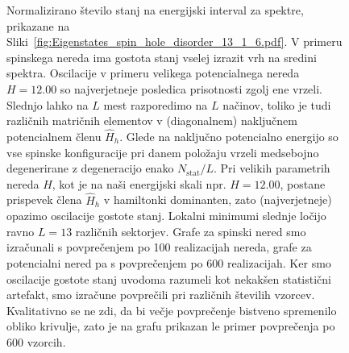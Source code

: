  \begin{figure}[H]
\caption{Normalizirano število stanj na energijski interval za spektre, prikazane na Sliki~\ref{fig:Eigenstates_spin_hole_disorder_13_1_6.pdf}. V primeru spinskega nereda ima gostota stanj vselej izrazit vrh na sredini spektra. Oscilacije v primeru velikega potencialnega nereda $H=12.00$ so najverjetneje posledica prisotnosti zgolj ene vrzeli. Slednjo lahko na $L$ mest razporedimo na $L$ načinov, toliko je tudi različnih matričnih elementov v (diagonalnem) naključnem potencialnem členu $\hat{H}_h$. Glede na naključno potencialno energijo so vse spinske konfiguracije pri danem položaju vrzeli medsebojno degenerirane z degeneracijo enako $N_\mathrm{stat}/L$. Pri velikih parametrih nereda $H$, kot je na naši energijski skali npr. $H=12.00$, postane prispevek člena $\hat{H}_h$ v hamiltonki dominanten, zato (najverjetneje) opazimo oscilacije gostote stanj. Lokalni minimumi slednje ločijo ravno $L=13$ različnih sektorjev. Grafe za spinski nered smo izračunali s povprečenjem po 100 realizacijah nereda, grafe za potencialni nered pa s povprečenjem po 600 realizacijah. Ker smo oscilacije gostote stanj uvodoma razumeli kot nekakšen statistični artefakt, smo izračune povprečili pri različnih številih vzorcev.  Kvalitativno se ne zdi, da bi večje povprečenje bistveno spremenilo obliko krivulje, zato je na grafu prikazan le primer povprečenja po 600 vzorcih.}
\label{fig:DOS_spin_hole_disorder_13_1_6.pdf}
\end{figure}
